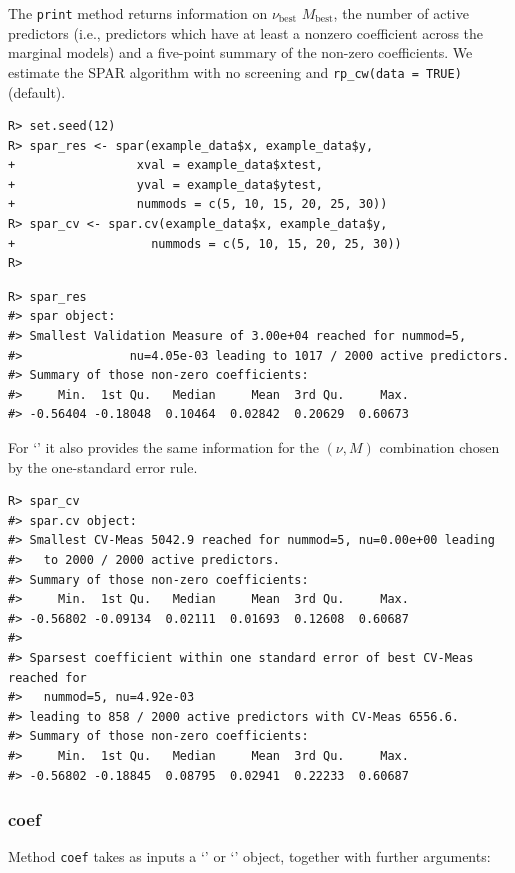 \documentclass[
  article,
  nojss]{jss}
\newcommand{\class}[1]{`\code{#1}'}
\begin{document}
The \texttt{print} method returns information on \(\nu_\text{best}\)
\(M_\text{best}\), the number of active predictors (i.e., predictors
which have at least a nonzero coefficient across the marginal models)
and a five-point summary of the non-zero coefficients. We estimate the
SPAR algorithm with no screening and \texttt{rp\_cw(data\ =\ TRUE)}
(default).

\begin{verbatim}
R> set.seed(12)
R> spar_res <- spar(example_data$x, example_data$y,
+                 xval = example_data$xtest,
+                 yval = example_data$ytest,
+                 nummods = c(5, 10, 15, 20, 25, 30))
R> spar_cv <- spar.cv(example_data$x, example_data$y,
+                   nummods = c(5, 10, 15, 20, 25, 30))
R> 
\end{verbatim}

\begin{verbatim}
R> spar_res
#> spar object:
#> Smallest Validation Measure of 3.00e+04 reached for nummod=5,
#>               nu=4.05e-03 leading to 1017 / 2000 active predictors.
#> Summary of those non-zero coefficients:
#>     Min.  1st Qu.   Median     Mean  3rd Qu.     Max. 
#> -0.56404 -0.18048  0.10464  0.02842  0.20629  0.60673
\end{verbatim}

For \class{spar.cv} it also provides the same information for the
\((\nu, M)\) combination chosen by the one-standard error rule.

\begin{verbatim}
R> spar_cv
#> spar.cv object:
#> Smallest CV-Meas 5042.9 reached for nummod=5, nu=0.00e+00 leading
#>   to 2000 / 2000 active predictors.
#> Summary of those non-zero coefficients:
#>     Min.  1st Qu.   Median     Mean  3rd Qu.     Max. 
#> -0.56802 -0.09134  0.02111  0.01693  0.12608  0.60687 
#> 
#> Sparsest coefficient within one standard error of best CV-Meas reached for
#>   nummod=5, nu=4.92e-03 
#> leading to 858 / 2000 active predictors with CV-Meas 6556.6.
#> Summary of those non-zero coefficients:
#>     Min.  1st Qu.   Median     Mean  3rd Qu.     Max. 
#> -0.56802 -0.18845  0.08795  0.02941  0.22233  0.60687
\end{verbatim}

\subsubsection{coef}\label{coef}

Method \texttt{coef} takes as inputs a \class{spar} or \class{spar.cv}
object, together with further arguments:
\end{document}

